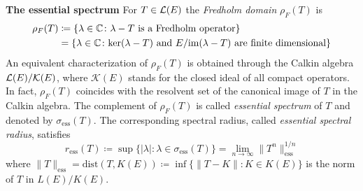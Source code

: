 \begin{example}{\textbf{The essential spectrum}}
\label{subsec:a3-3.7}	
For $T \in \mathcal{L}(E)$ the \emph{Fredholm domain} $\rho_{F}(T)$ is
\begin{align*}\label{eq:a3-3.5}
\rho_{F}(T) & \coloneqq  \{\lambda \in \mathbb{C} \colon \lambda - T \text{ is a Fredholm operator}\}\\
& =  \{\lambda \in \mathbb{C} \colon \text{ker}(\lambda - T) \text{ and } E/\text{im}(\lambda - T) \text{ are finite dimensional}\}
\end{align*}
An equivalent characterization of $\rho_{F}(T)$ is obtained through the Calkin algebra $\mathcal{L}(E)/\mathcal{K}(E)$, where $\mathcal{K}(E)$ stands for the closed ideal of all compact operators.
In fact, $\rho_{F}(T)$ coincides with the resolvent set of the canonical image of $T$ in the Calkin algebra.
The complement of $\rho_{F}(T)$ is called \emph{essential spectrum} of $T$ and denoted by $\sigma_{\text{ess}}(T)$.
The corresponding spectral radius, called \emph{essential spectral radius}, satisfies
\begin{equation}\label{eq:a3-3.5}
r_{\text{ess}}(T) \coloneqq \sup \{|\lambda| \colon \lambda \in \sigma_{\text{ess}}(T)\} = \lim_{n \to \infty} \|T^{n}\|_{\text{ess}}^{1/n}
\end{equation}
where $\|T\|_{\text{ess}} = \text{dist}(T,K(E)) \coloneqq \inf \{\|T - K\| \colon K \in K(E)\}$ is the norm of $T$ in $L(E)/K(E)$.


\end{example}
